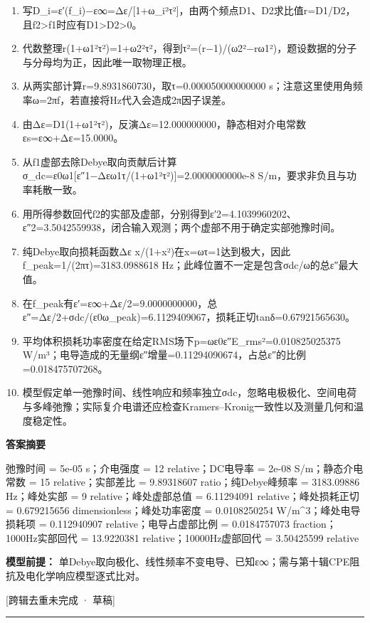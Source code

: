 \documentclass[UTF8,11pt,a4paper]{ctexart}
\begin{document}
\begin{enumerate}
\item 写D\_i=ε′(f\_i)−ε∞=Δε/[1+ω\_i²τ²]，由两个频点D1、D2求比值r=D1/D2，且f2>f1时应有D1>D2>0。
\item 代数整理r(1+ω1²τ²)=1+ω2²τ²，得到τ²=(r−1)/(ω2²−rω1²)，题设数据的分子与分母均为正，因此唯一取物理正根。
\item 从两实部计算r=9.8931860730，取τ=0.000050000000000 s；注意这里使用角频率ω=2πf，若直接将Hz代入会造成2π因子误差。
\item 由Δε=D1(1+ω1²τ²)，反演Δε=12.000000000，静态相对介电常数εs=ε∞+Δε=15.0000。
\item 从f1虚部去除Debye取向贡献后计算σ\_dc=ε0ω1[ε″1−Δεω1τ/(1+ω1²τ²)]=2.0000000000e-8 S/m，要求非负且与功率耗散一致。
\item 用所得参数回代f2的实部及虚部，分别得到ε′2=4.1039960202、ε″2=3.5042559938，闭合输入观测；两个虚部不用于确定实部弛豫时间。
\item 纯Debye取向损耗函数Δε x/(1+x²)在x=ωτ=1达到极大，因此f\_peak=1/(2πτ)=3183.0988618 Hz；此峰位置不一定是包含σdc/ω的总ε″最大值。
\item 在f\_peak有ε′=ε∞+Δε/2=9.0000000000，总ε″=Δε/2+σdc/(ε0ω\_peak)=6.1129409067，损耗正切tanδ=0.67921565630。
\item 平均体积损耗功率密度在给定RMS场下p=ωε0ε″E\_rms²=0.010825025375 W/m³；电导造成的无量纲ε″增量=0.11294090674，占总ε″的比例=0.018475707268。
\item 模型假定单一弛豫时间、线性响应和频率独立σdc，忽略电极极化、空间电荷与多峰弛豫；实际复介电谱还应检查Kramers–Kronig一致性以及测量几何和温度稳定性。
\end{enumerate}
\noindent\textbf{答案摘要}\par
弛豫时间 = 5e-05 s；介电强度 = 12 relative；DC电导率 = 2e-08 S/m；静态介电常数 = 15 relative；实部差比 = 9.89318607 ratio；纯Debye峰频率 = 3183.09886 Hz；峰处实部 = 9 relative；峰处虚部总值 = 6.11294091 relative；峰处损耗正切 = 0.679215656 dimensionless；峰处功率密度 = 0.0108250254 W/m\textasciicircum{}3；峰处电导损耗项 = 0.112940907 relative；电导占虚部比例 = 0.0184757073 fraction；1000Hz实部回代 = 13.9220381 relative；10000Hz虚部回代 = 3.50425599 relative\par
\noindent\textbf{模型前提：}
单Debye取向极化、线性频率不变电导、已知ε∞；需与第十辑CPE阻抗及电化学响应模型逐式比对。\par
\noindent\textcolor{red!65!black}{[跨辑去重未完成 · 草稿]} \par
\medskip\hrule\medskip
{}
\end{document}
